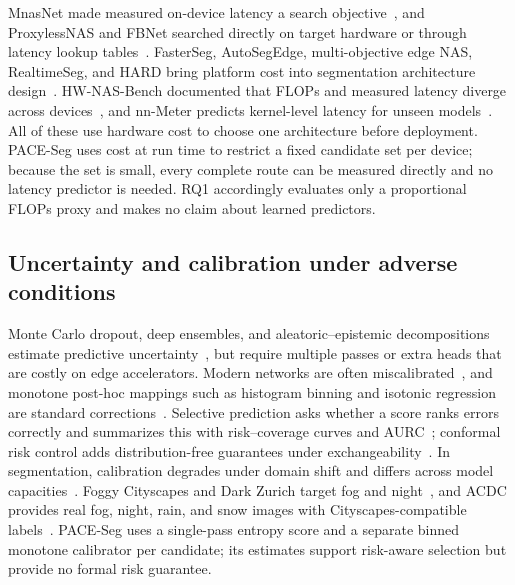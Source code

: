 \documentclass[a4paper,5p]{elsarticle}
\newcommand{\method}{PACE-Seg}
\begin{document}
MnasNet made measured on-device latency a search objective~\cite{tan2019mnasnet}, and ProxylessNAS and FBNet searched directly on target hardware or through latency lookup tables~\cite{cai2019proxylessnas,wu2019fbnet}. FasterSeg, AutoSegEdge, multi-objective edge NAS, RealtimeSeg, and HARD bring platform cost into segmentation architecture design~\cite{chen2020fasterseg,dou2023autosegedge,dou2024multiobjective,li2023realtimeseg,kwon2024hard}. HW-NAS-Bench documented that FLOPs and measured latency diverge across devices~\cite{li2021hwnasbench}, and nn-Meter predicts kernel-level latency for unseen models~\cite{zhang2021nnmeter}. All of these use hardware cost to choose one architecture before deployment. \method{} uses cost at run time to restrict a fixed candidate set per device; because the set is small, every complete route can be measured directly and no latency predictor is needed. RQ1 accordingly evaluates only a proportional FLOPs proxy and makes no claim about learned predictors.

\subsection{Uncertainty and calibration under adverse conditions}

Monte Carlo dropout, deep ensembles, and aleatoric--epistemic decompositions estimate predictive uncertainty~\cite{gal2016dropout,lakshminarayanan2017ensembles,kendall2017uncertainties}, but require multiple passes or extra heads that are costly on edge accelerators. Modern networks are often miscalibrated~\cite{guo2017calibration}, and monotone post-hoc mappings such as histogram binning and isotonic regression are standard corrections~\cite{zadrozny2002isotonic}. Selective prediction asks whether a score ranks errors correctly and summarizes this with risk--coverage curves and AURC~\cite{geifman2017selective}; conformal risk control adds distribution-free guarantees under exchangeability~\cite{angelopoulos2024crc}. In segmentation, calibration degrades under domain shift and differs across model capacities~\cite{wang2023calibrating,dejorge2023reliability}. Foggy Cityscapes and Dark Zurich target fog and night~\cite{sakaridis2018foggy,sakaridis2019darkzurich}, and ACDC provides real fog, night, rain, and snow images with Cityscapes-compatible labels~\cite{sakaridis2021acdc}. \method{} uses a single-pass entropy score and a separate binned monotone calibrator per candidate; its estimates support risk-aware selection but provide no formal risk guarantee.
\end{document}

